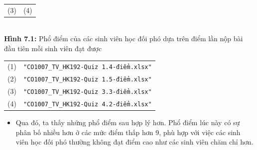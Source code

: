 \documentclass[a4paper]{article}
\theoremstyle{definition}
\begin{document}
\begin{enumerate}[a)]
\begin{itemize}
\begin{center}
\begin{tabular}{c c}
                 (3) & (4)
            \end{tabular}\\
            \textbf{Hình 7.1:} Phổ điểm của các sinh viên học đối phó dựa trên điểm lần nộp bài đầu tiên mỗi sinh viên đạt được\\
            \begin{tabular}{c c}
                 (1) & \texttt{"CO1007\_TV\_HK192-Quiz 1.4-điểm.xlsx"}\\
                 (2) & \texttt{"CO1007\_TV\_HK192-Quiz 1.5-điểm.xlsx"}\\
                 (3) & \texttt{"CO1007\_TV\_HK192-Quiz 3.3-điểm.xlsx"}\\
                 (4) & \texttt{"CO1007\_TV\_HK192-Quiz 4.2-điểm.xlsx"}
            \end{tabular}
        \end{center} 
        \begin{itemize}
            \item Qua đó, ta thấy những phổ điểm sau hợp lý hơn. Phổ điểm lúc này có sự phân bố nhiều hơn ở các mức điểm thấp hơn 9, phù hợp với việc các sinh viên học đối phó thường không đạt điểm cao như các sinh viên chăm chỉ hơn.
        \end{itemize}    
    \end{itemize}
\end{enumerate}
\end{document}

